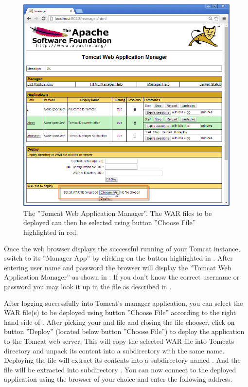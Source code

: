 \documentclass[a4paper,10pt,twoside]{book}
\begin{document}
\begin{figure}
\includegraphics[width=14cm]{tomcat_managerapp_selectwar.png}
\caption{The ''Tomcat Web Application Manager''.
The WAR files to be deployed can then be selected using button ''Choose File'' highlighted in red.}
\end{figure}

Once the web browser displays the successful running of your Tomcat instance, switch to its ''Manager App'' by clicking on the button highlighted in .
After entering user name and password the browser will display the ''Tomcat Web Application Manager'' as shown in .
If you don't know the correct username or password you may look it up in the file  as described in .

After logging successfully into Tomcat's manager application, you can select the WAR file(s) to be deployed using button ''Choose File'' according to the right hand side of .
After picking your  and  file and closing the file chooser, click on button ''Deploy'' (located below button ''Choose File'') to deploy the application to the Tomcat web server.
This will copy the selected WAR file into Tomcats  directory and unpack its content into a subdirectory with the same name.
Deploying the file  will extract its contents into a subdirectory named .
And the file  will be extracted into subdirectory .
You can now connect to the deployed application using the browser of your choice and enter the following address.
\end{document}
